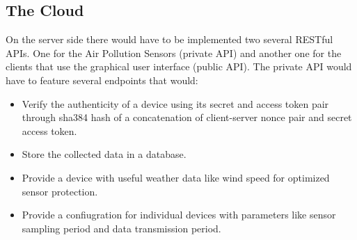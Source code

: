 \documentclass{article}
\begin{document}
		\subsection{The Cloud}
			On the server side there would have to be implemented two several RESTful APIs. One for the Air Pollution Sensors (private API) and another one for the clients that use the graphical user interface (public API).
			The private API would have to feature several endpoints that would:
			\begin{itemize}
				\item Verify the authenticity of a device using its secret and access token pair through sha384 hash of a concatenation of client-server nonce pair and secret access token.
				\item Store the collected data in a database.
				\item Provide a device with useful weather data like wind speed for optimized sensor protection.
				\item Provide a confiugration for individual devices with parameters like sensor sampling period and data transmission period.
			\end{itemize}
			
\end{document}
